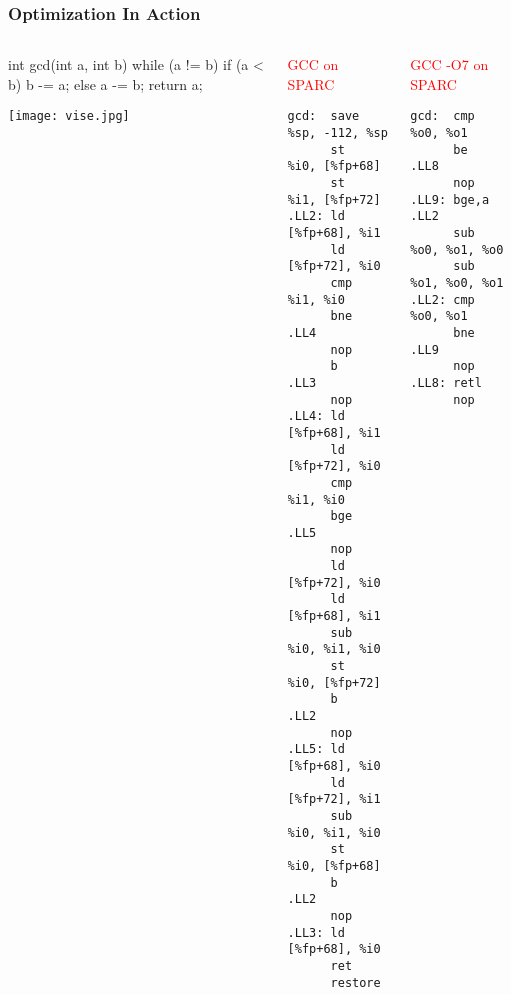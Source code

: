 \documentclass{plt}
\begin{document}
\begin{frame}[fragile=singleslide]
  \frametitle{Optimization In Action}

\begin{columns}
  \begin{column}[t]{0.4\textwidth}
\mbox{}
\begin{C}
int gcd(int a, int b) {
  while (a != b) {
    if (a < b) b -= a;
    else a -= b;
  }
  return a;
}
\end{C}

\vspace{1pc}

\texttt{[image: vise.jpg]}
  \end{column}
  \begin{column}[t]{0.3\textwidth}
\fontsize{7}{7}\selectfont
\textcolor{red}{GCC on SPARC}
\begin{verbatim}
gcd:  save %sp, -112, %sp
      st   %i0, [%fp+68]
      st   %i1, [%fp+72]
.LL2: ld   [%fp+68], %i1
      ld   [%fp+72], %i0
      cmp  %i1, %i0
      bne  .LL4
      nop 
      b    .LL3
      nop 
.LL4: ld   [%fp+68], %i1
      ld   [%fp+72], %i0
      cmp  %i1, %i0
      bge  .LL5
      nop 
      ld   [%fp+72], %i0
      ld   [%fp+68], %i1
      sub  %i0, %i1, %i0
      st   %i0, [%fp+72]
      b    .LL2
      nop 
.LL5: ld   [%fp+68], %i0
      ld   [%fp+72], %i1
      sub  %i0, %i1, %i0
      st   %i0, [%fp+68]
      b    .LL2
      nop 
.LL3: ld   [%fp+68], %i0
      ret
      restore
\end{verbatim}
  \end{column}
  \begin{column}[t]{0.3\textwidth}
\fontsize{7}{7}\selectfont
\textcolor{red}{GCC -O7 on SPARC}
\begin{verbatim}
gcd:  cmp   %o0, %o1
      be    .LL8
      nop  
.LL9: bge,a .LL2
      sub   %o0, %o1, %o0
      sub   %o1, %o0, %o1
.LL2: cmp   %o0, %o1
      bne   .LL9
      nop
.LL8: retl
      nop
\end{verbatim}
  \end{column}
\end{columns}

\end{frame}
\end{document}
